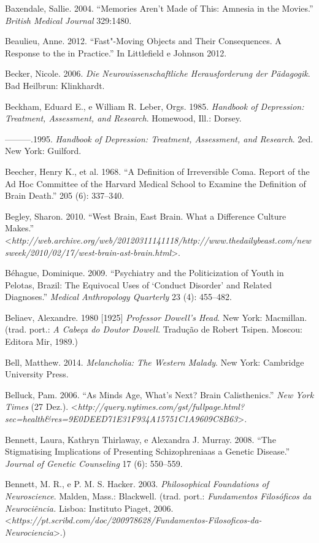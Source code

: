 Baxendale, Sallie. 2004. ``Memories Aren't Made of This: Amnesia in the
Movies.'' \emph{British Medical Journal} 329:1480.

Beaulieu, Anne. 2012. ``Fast"-Moving Objects and Their Consequences. A
Response to the  in Practice.'' In Littlefield e Johnson 2012.

Becker, Nicole. 2006. \emph{Die Neurowissenschaftliche Herausforderung
der Pädagogik}. Bad Heilbrun: Klinkhardt.

Beckham, Eduard E., e William R. Leber, Orgs. 1985. \emph{Handbook of
Depression: Treatment, Assessment, and Research}. Homewood, Ill.:
Dorsey.

---------.1995. \emph{Handbook of Depression: Treatment, Assessment, and
Research}. 2ed. New York: Guilford.

Beecher, Henry K., et al. 1968. ``A Definition of Irreversible Coma.
Report of the Ad Hoc Committee of the Harvard Medical School to Examine
the Definition of Brain Death.'' \emph{} 205 (6): 337--340.

Begley, Sharon. 2010. ``West Brain, East Brain. What a Difference
Culture Makes.''
\textless{}\emph{http://web.archive.org/web/20120311141118/http://www.thedailybeast.com/newsweek/2010/02/17/west-brain-ast-brain.html}\textgreater{}.

Béhague, Dominique. 2009. ``Psychiatry and the Politicization of Youth
in Pelotas, Brazil: The Equivocal Uses of `Conduct Disorder' and Related
Diagnoses.'' \emph{Medical Anthropology Quarterly} 23 (4): 455--482.

Beliaev, Alexandre. 1980 {[}1925{]} \emph{Professor Dowell's Head}. New
York: Macmillan. (trad. port.: \emph{A Cabeça do Doutor Dowell}.
Tradução de Robert Tsipen. Moscou: Editora Mir, 1989.)

Bell, Matthew. 2014. \emph{Melancholia: The Western Malady}. New York:
Cambridge University Press.

Belluck, Pam. 2006. ``As Minds Age, What's Next? Brain Calisthenics.''
\emph{New York Times} (27 Dez.).
\textless{}\emph{http://query.nytimes.com/gst/fullpage.html?sec=health\&res=9E0DEED71E31F934A15751C1A9609C8B63}\textgreater{}.

Bennett, Laura, Kathryn Thirlaway, e Alexandra J. Murray. 2008. ``The
Stigmatising Implications of Presenting Schizophreniaas a Genetic
Disease.'' \emph{Journal of Genetic Counseling} 17 (6): 550--559.

Bennett, M. R., e P. M. S. Hacker. 2003. \emph{Philosophical Foundations
of Neuroscience}. Malden, Mass.: Blackwell. (trad. port.:
\emph{Fundamentos Filosóficos da Neurociência.} Lisboa: Instituto
Piaget, 2006.
\textless{}\emph{https://pt.scribd.com/doc/200978628/Fundamentos-Filosoficos-da-Neurociencia}\textgreater{}.)


